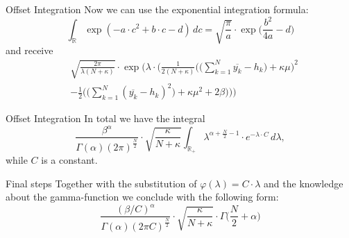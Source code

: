 \documentclass{beamer}
\newcommand{\R}{\mathbb{R}}
\begin{document}
  	\begin{frame}{Offset Integration}
  		Now we can use the exponential integration formula:
  		\[
  			\int_\R \exp(-a \cdot c^2 + b \cdot c - d) \, dc = \sqrt{\frac{\pi}					{a}} \cdot \exp \biggl( \frac{b^2}{4a} - d \biggr)
  		\]
  		and receive
  		\begin{align}
  			& \sqrt{\frac{2 \pi}{\lambda(N + \kappa)}} \cdot \exp \Biggl( \lambda 				\cdot \Biggl( \frac{1}{2(N + \kappa)} \Biggl(\Biggl(\sum_{k = 1}^N 					\overline{y_k} - h_k\Biggr)+ \kappa \mu \Biggr)^2 \\
    		&- \frac{1}{2}\Biggl( \Biggl( \sum_{k = 1}^N (\overline{y_k} - h_k)^2 				\Biggr) + \kappa \mu^2 + 2\beta \Biggr) \Biggr) \Biggr)
  		\end{align}
  	\end{frame}
  	
  	\begin{frame}{Offset Integration}
  		In total we have the integral
  			\[
  				\frac{\beta^\alpha}{\Gamma(\alpha) (2\pi)^{\frac{N}{2}}} \cdot 						\sqrt{\frac{\kappa}{N + \kappa}} \int_{\R_+} \lambda^{\alpha + 						\frac{N}{2} - 1} \cdot e^{-\lambda \cdot C} \, d\lambda,
  			\]
  		while $C$ is a constant.
  	\end{frame}
  	
  	\begin{frame}{Final steps}
  		Together with the substitution of $\varphi (\lambda) = C \cdot \lambda$ 			and the knowledge about the gamma-function we conclude with the following 			form:
  		\[
  			\frac{(\beta / C)^\alpha}{\Gamma(\alpha) (2\pi C)^{\frac{N}{2}}} \cdot 			\sqrt{\frac{\kappa}{N + \kappa}} \cdot \Gamma \biggl(\frac{N}{2} + 					\alpha \biggr)
  		\]
   	\end{frame}
   	
\end{document}
